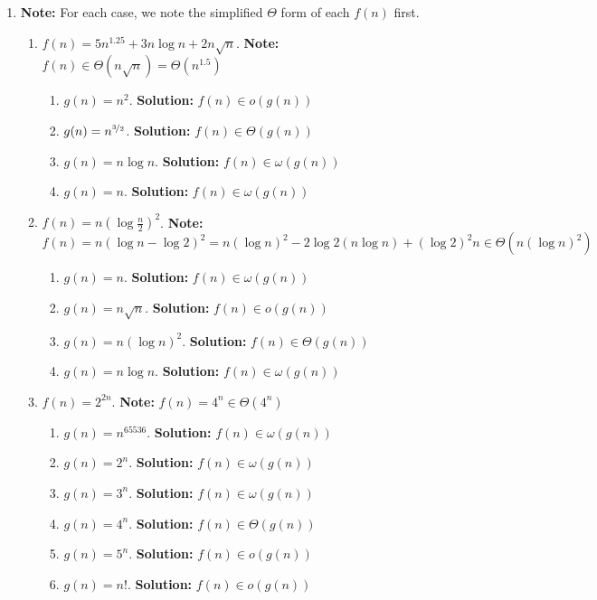 \documentclass{article}
\begin{document}
\begin{enumerate}
  \pagebreak[2]
\item \textbf{Note:} For each case, we note the simplified \(\Theta\)
  form of each \(f(n)\) first.
  \begin{enumerate}
  \item \(f(n) = 5n^{1.25} + 3n\log n + 2 n\sqrt{n}\).
    \textbf{Note:} \(f(n) \in \Theta(n\sqrt{n}) = \Theta(n^{1.5})\)
    \begin{enumerate}
    \item \(g(n) = n^2\).
      \textbf{Solution:} \(f(n) \in o(g(n))\)
    \item \(g(n) = n^{\nicefrac{3}{2}}\).
      \textbf{Solution:} \(f(n) \in \Theta(g(n))\)
    \item \(g(n) = n\log n\).
      \textbf{Solution:} \(f(n) \in \omega(g(n))\)
    \item \(g(n) = n\).
      \textbf{Solution:} \(f(n) \in \omega(g(n))\)
    \end{enumerate}
  \item \(f(n) = n (\log \frac{n}{2})^2\).
    \textbf{Note:}
    \(f(n)
    = n (\log n - \log 2)^2
    = n(\log n)^2 - 2\log2(n\log n) + (\log 2)^2n
    \in \Theta(n (\log n)^2)\)
    \begin{enumerate}
    \item \(g(n) = n\).
      \textbf{Solution:} \(f(n) \in \omega(g(n))\)
    \item \(g(n) = n \sqrt{n}\).
      \textbf{Solution:} \(f(n) \in o(g(n))\)
    \item \(g(n) = n (\log n)^2\).
      \textbf{Solution:} \(f(n) \in \Theta(g(n))\)
    \item \(g(n) = n \log n\).
      \textbf{Solution:} \(f(n) \in \omega(g(n))\)
    \end{enumerate}
  \item \(f(n) = 2^{2n}\).
    \textbf{Note:} \(f(n) = 4^n \in \Theta(4^n)\)
    \begin{enumerate}
      \item \(g(n) = n^{65536}\).
        \textbf{Solution:} \(f(n) \in \omega(g(n))\)
      \item \(g(n) = 2^n\).
        \textbf{Solution:} \(f(n) \in \omega(g(n))\)
      \item \(g(n) = 3^n\).
        \textbf{Solution:} \(f(n) \in \omega(g(n))\)
      \item \(g(n) = 4^n\).
        \textbf{Solution:} \(f(n) \in \Theta(g(n))\)
      \item \(g(n) = 5^n\).
        \textbf{Solution:} \(f(n) \in o(g(n))\)
      \item \(g(n) = n!\).
        \textbf{Solution:} \(f(n) \in o(g(n))\)
    \end{enumerate}
  \end{enumerate}


\end{enumerate}
\end{document}
